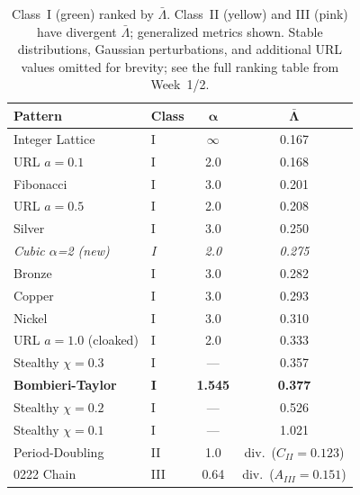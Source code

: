 \documentclass[11pt,letterpaper]{article}
\begin{document}
\begin{table}[H]
\centering\small
\begin{tabular}{llcc}
\toprule
\textbf{Pattern} & \textbf{Class} & $\boldsymbol{\alpha}$ & $\boldsymbol{\bar{\Lambda}}$ \\
\midrule
\rowcolor{classI} Integer Lattice                   & I   & $\infty$  & 0.167 \\
\rowcolor{classI} URL $a=0.1$                       & I   & 2.0       & 0.168 \\
\rowcolor{classI} Fibonacci                         & I   & 3.0       & 0.201 \\
\rowcolor{classI} URL $a=0.5$                       & I   & 2.0       & 0.208 \\
\rowcolor{classI} Silver                            & I   & 3.0       & 0.250 \\
\rowcolor{classI} \textit{Cubic $\alpha$=2 (new)}   & \textit{I} & \textit{2.0} & \textit{0.275} \\
\rowcolor{classI} Bronze                            & I   & 3.0       & 0.282 \\
\rowcolor{classI} Copper                            & I   & 3.0       & 0.293 \\
\rowcolor{classI} Nickel                            & I   & 3.0       & 0.310 \\
\rowcolor{classI} URL $a=1.0$ (cloaked)             & I   & 2.0       & 0.333 \\
\rowcolor{classI} Stealthy $\chi=0.3$               & I   & ---       & 0.357 \\
\rowcolor{classI} \textbf{Bombieri-Taylor}          & \textbf{I} & \textbf{1.545} & \textbf{0.377} \\
\rowcolor{classI} Stealthy $\chi=0.2$               & I   & ---       & 0.526 \\
\rowcolor{classI} Stealthy $\chi=0.1$               & I   & ---       & 1.021 \\
\midrule
\rowcolor{classII} Period-Doubling                  & II  & 1.0       & div.\ ($C_{II}=0.123$) \\
\midrule
\rowcolor{classIII} 0222 Chain                      & III & 0.64      & div.\ ($A_{III}=0.151$) \\
\bottomrule
\end{tabular}
\caption{Class~I (green) ranked by $\bar\Lambda$. Class~II (yellow) and III (pink) have
divergent $\bar\Lambda$; generalized metrics shown. Stable distributions, Gaussian perturbations,
and additional URL values omitted for brevity; see the full ranking table from Week~1/2.}
\end{table}
\end{document}
